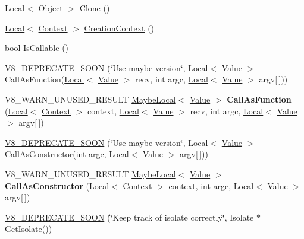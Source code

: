 \begin{DoxyCompactItemize}
\item 
\hyperlink{classv8_1_1Local}{Local}$<$ \hyperlink{classv8_1_1Object}{Object} $>$ \hyperlink{classv8_1_1Object_a5018c9d085aa71f65530cf1e073a04ad}{Clone} ()
\item 
\hyperlink{classv8_1_1Local}{Local}$<$ \hyperlink{classv8_1_1Context}{Context} $>$ \hyperlink{classv8_1_1Object_af6966283a7d7e20779961eed434db04d}{Creation\+Context} ()
\item 
bool \hyperlink{classv8_1_1Object_a23c2c1f23b50fab4a02e2f819641b865}{Is\+Callable} ()
\item 
\hyperlink{classv8_1_1Object_a5aa2616e9deaf26533c3870df2925530}{V8\+\_\+\+D\+E\+P\+R\+E\+C\+A\+T\+E\+\_\+\+S\+O\+O\+N} (\char`\"{}Use maybe version\char`\"{}, Local$<$ \hyperlink{classv8_1_1Value}{Value} $>$ Call\+As\+Function(\hyperlink{classv8_1_1Local}{Local}$<$ \hyperlink{classv8_1_1Value}{Value} $>$ recv, int argc, \hyperlink{classv8_1_1Local}{Local}$<$ \hyperlink{classv8_1_1Value}{Value} $>$ argv\mbox{[}$\,$\mbox{]}))
\item 
\hypertarget{classv8_1_1Object_aec7375fe34a800baac4e26deb33ccac0}{}V8\+\_\+\+W\+A\+R\+N\+\_\+\+U\+N\+U\+S\+E\+D\+\_\+\+R\+E\+S\+U\+L\+T \hyperlink{classv8_1_1MaybeLocal}{Maybe\+Local}$<$ \hyperlink{classv8_1_1Value}{Value} $>$ {\bfseries Call\+As\+Function} (\hyperlink{classv8_1_1Local}{Local}$<$ \hyperlink{classv8_1_1Context}{Context} $>$ context, \hyperlink{classv8_1_1Local}{Local}$<$ \hyperlink{classv8_1_1Value}{Value} $>$ recv, int argc, \hyperlink{classv8_1_1Local}{Local}$<$ \hyperlink{classv8_1_1Value}{Value} $>$ argv\mbox{[}$\,$\mbox{]})\label{classv8_1_1Object_aec7375fe34a800baac4e26deb33ccac0}

\item 
\hyperlink{classv8_1_1Object_a10222e80df73aaa0b381f4dabe6b5dd7}{V8\+\_\+\+D\+E\+P\+R\+E\+C\+A\+T\+E\+\_\+\+S\+O\+O\+N} (\char`\"{}Use maybe version\char`\"{}, Local$<$ \hyperlink{classv8_1_1Value}{Value} $>$ Call\+As\+Constructor(int argc, \hyperlink{classv8_1_1Local}{Local}$<$ \hyperlink{classv8_1_1Value}{Value} $>$ argv\mbox{[}$\,$\mbox{]}))
\item 
\hypertarget{classv8_1_1Object_a10dcefb0bd595a959234703690a02530}{}V8\+\_\+\+W\+A\+R\+N\+\_\+\+U\+N\+U\+S\+E\+D\+\_\+\+R\+E\+S\+U\+L\+T \hyperlink{classv8_1_1MaybeLocal}{Maybe\+Local}$<$ \hyperlink{classv8_1_1Value}{Value} $>$ {\bfseries Call\+As\+Constructor} (\hyperlink{classv8_1_1Local}{Local}$<$ \hyperlink{classv8_1_1Context}{Context} $>$ context, int argc, \hyperlink{classv8_1_1Local}{Local}$<$ \hyperlink{classv8_1_1Value}{Value} $>$ argv\mbox{[}$\,$\mbox{]})\label{classv8_1_1Object_a10dcefb0bd595a959234703690a02530}

\item 
\hyperlink{classv8_1_1Object_a5e7199a517d980396bb86f876b5bae0a}{V8\+\_\+\+D\+E\+P\+R\+E\+C\+A\+T\+E\+\_\+\+S\+O\+O\+N} (\char`\"{}Keep track of isolate correctly\char`\"{}, Isolate $\ast$Get\+Isolate())
\end{DoxyCompactItemize}
